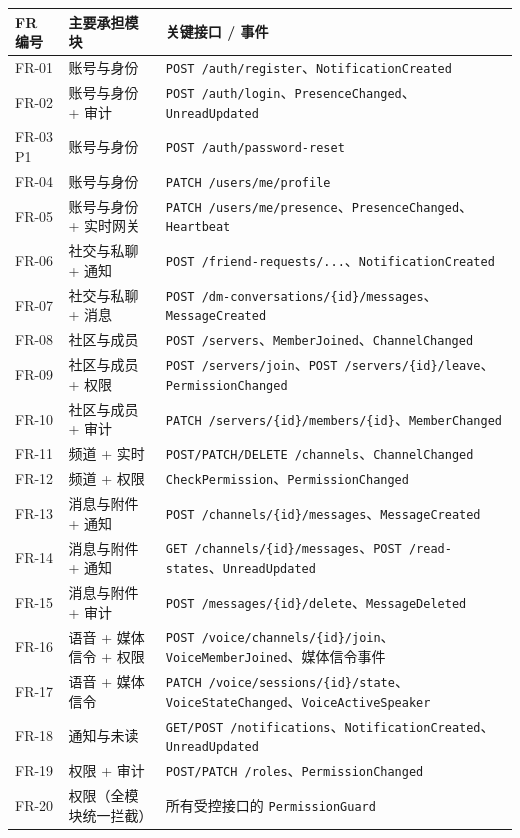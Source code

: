 \noindent\begin{tabularx}{\textwidth}{L{1.8cm}L{4cm}Y}
  \toprule
  FR 编号 & 主要承担模块 & 关键接口 / 事件 \\
  \midrule
  FR-01 & 账号与身份 & \texttt{POST /auth/register}、\texttt{NotificationCreated} \\
  FR-02 & 账号与身份 + 审计 & \texttt{POST /auth/login}、\texttt{PresenceChanged}、\texttt{UnreadUpdated} \\
  FR-03 P1 & 账号与身份 & \texttt{POST /auth/password-reset} \\
  FR-04 & 账号与身份 & \texttt{PATCH /users/me/profile} \\
  FR-05 & 账号与身份 + 实时网关 & \texttt{PATCH /users/me/presence}、\texttt{PresenceChanged}、\texttt{Heartbeat} \\
  FR-06 & 社交与私聊 + 通知 & \texttt{POST /friend-requests/...}、\texttt{NotificationCreated} \\
  FR-07 & 社交与私聊 + 消息 & \texttt{POST /dm-conversations/\{id\}/messages}、\texttt{MessageCreated} \\
  FR-08 & 社区与成员 & \texttt{POST /servers}、\texttt{MemberJoined}、\texttt{ChannelChanged} \\
  FR-09 & 社区与成员 + 权限 & \texttt{POST /servers/join}、\texttt{POST /servers/\{id\}/leave}、\texttt{PermissionChanged} \\
  FR-10 & 社区与成员 + 审计 & \texttt{PATCH /servers/\{id\}/members/\{id\}}、\texttt{MemberChanged} \\
  FR-11 & 频道 + 实时 & \texttt{POST/PATCH/DELETE /channels}、\texttt{ChannelChanged} \\
  FR-12 & 频道 + 权限 & \texttt{CheckPermission}、\texttt{PermissionChanged} \\
  FR-13 & 消息与附件 + 通知 & \texttt{POST /channels/\{id\}/messages}、\texttt{MessageCreated} \\
  FR-14 & 消息与附件 + 通知 & \texttt{GET /channels/\{id\}/messages}、\texttt{POST /read-states}、\texttt{UnreadUpdated} \\
  FR-15 & 消息与附件 + 审计 & \texttt{POST /messages/\{id\}/delete}、\texttt{MessageDeleted} \\
  FR-16 & 语音 + 媒体信令 + 权限 & \texttt{POST /voice/channels/\{id\}/join}、\texttt{VoiceMemberJoined}、媒体信令事件 \\
  FR-17 & 语音 + 媒体信令 & \texttt{PATCH /voice/sessions/\{id\}/state}、\texttt{VoiceStateChanged}、\texttt{VoiceActiveSpeaker} \\
  FR-18 & 通知与未读 & \texttt{GET/POST /notifications}、\texttt{NotificationCreated}、\texttt{UnreadUpdated} \\
  FR-19 & 权限 + 审计 & \texttt{POST/PATCH /roles}、\texttt{PermissionChanged} \\
  FR-20 & 权限（全模块统一拦截） & 所有受控接口的 \texttt{PermissionGuard} \\
  \bottomrule
\end{tabularx}

